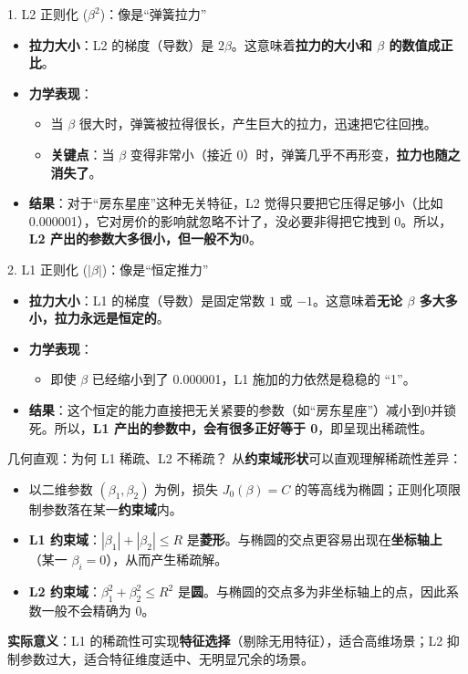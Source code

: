 \documentclass[aspectratio=169]{beamer}
\begin{document}
\begin{frame}{1. L2 正则化 ($\beta^2$)：像是“弹簧拉力”}
    \begin{itemize}
        \item \textbf{拉力大小}：L2 的梯度（导数）是 $2\beta$。这意味着\textbf{拉力的大小和 $\beta$ 的数值成正比}。
        \item \textbf{力学表现}：
        \begin{itemize}
            \item 当 $\beta$ 很大时，弹簧被拉得很长，产生巨大的拉力，迅速把它往回拽。
            \item \textbf{关键点}：当 $\beta$ 变得非常小（接近 0）时，弹簧几乎不再形变，\textbf{拉力也随之消失了}。
        \end{itemize}
        \item \textbf{结果}：对于“房东星座”这种无关特征，L2 觉得只要把它压得足够小（比如 0.000001），它对房价的影响就忽略不计了，没必要非得把它拽到 0。所以，\textbf{L2 产出的参数大多很小，但一般不为0}。
    \end{itemize}
\end{frame}

\begin{frame}{2. L1 正则化 ($|\beta|$)：像是“恒定推力”}
    \begin{itemize}
        \item \textbf{拉力大小}：L1 的梯度（导数）是固定常数 $1$ 或 $-1$。这意味着\textbf{无论 $\beta$ 多大多小，拉力永远是恒定的}。
        \item \textbf{力学表现}：
        \begin{itemize}
            \item 即使 $\beta$ 已经缩小到了 0.000001，L1 施加的力依然是稳稳的 “1”。
        \end{itemize}
        \item \textbf{结果}：这个恒定的能力直接把无关紧要的参数（如“房东星座”）减小到0并锁死。所以，\textbf{L1 产出的参数中，会有很多正好等于 0}，即呈现出稀疏性。
    \end{itemize}
\end{frame}

\begin{frame}{几何直观：为何 L1 稀疏、L2 不稀疏？}
    从\textbf{约束域形状}可以直观理解稀疏性差异：
    \begin{itemize}
        \item 以二维参数 $(\beta_1, \beta_2)$ 为例，损失 $J_0(\beta)=C$ 的等高线为椭圆；正则化项限制参数落在某一\textbf{约束域}内。
        \item \textbf{L1 约束域}：$|\beta_1|+|\beta_2|\le R$ 是\textbf{菱形}。与椭圆的交点更容易出现在\textbf{坐标轴上}（某一 $\beta_i=0$），从而产生稀疏解。
        \item \textbf{L2 约束域}：$\beta_1^2+\beta_2^2\le R^2$ 是\textbf{圆}。与椭圆的交点多为非坐标轴上的点，因此系数一般不会精确为 0。
    \end{itemize}
    \vspace{0.3cm}
    \textbf{实际意义}：L1 的稀疏性可实现\textbf{特征选择}（剔除无用特征），适合高维场景；L2 抑制参数过大，适合特征维度适中、无明显冗余的场景。
\end{frame}
\end{document}
